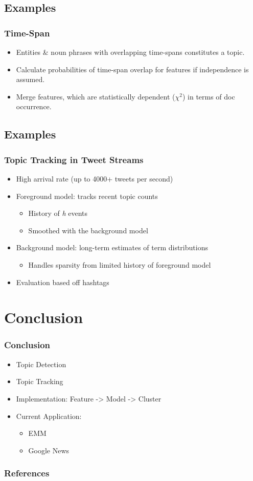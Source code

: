 \documentclass{beamer}
\begin{document}
\subsection{Examples}
\begin{frame}
	\frametitle{Time-Span \cite{Swan:1999:EST:319950.319956}}
	\begin{itemize}
		\item Entities \& noun phrases with overlapping time-spans constitutes a topic.
		\item Calculate probabilities of time-span overlap for features if independence is assumed.
		\item Merge features, which are statistically dependent ($\chi^2$) in terms of doc occurrence.
	\end{itemize}
\end{frame}

\subsection{Examples}
\begin{frame}
	\frametitle{Topic Tracking in Tweet Streams \cite{Lin:2011:STA:2020408.2020476}}
	\begin{itemize}
		\item High arrival rate (up to 4000+ tweets per second)
		\item Foreground model: tracks recent topic counts
			\begin{itemize}
				\item History of \emph{h} events
				\item Smoothed with the background model
			\end{itemize}
		\item Background model: long-term estimates of term distributions
			\begin{itemize}
				\item Handles sparsity from limited history of foreground model
			\end{itemize}
		\item Evaluation based off hashtags
	\end{itemize}
\end{frame}

\section{Conclusion}
\begin{frame}
	\frametitle{Conclusion}
	\begin{itemize}
		\item Topic Detection
		\item Topic Tracking
		\item Implementation: Feature -> Model -> Cluster
		\item Current Application:
			\begin{itemize}
				\item EMM
				\item Google News
			\end{itemize}
	\end{itemize}
\end{frame}

\begin{frame}
	\frametitle{References}
	
	
\end{frame}
\end{document}

